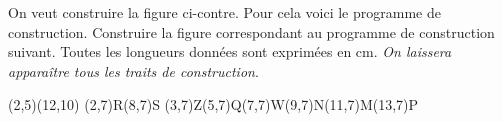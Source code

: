 \vspace*{1cm}\par
\begin{multicols}{2}
On veut construire la figure ci-contre. Pour cela voici le
programme de construction. Construire la figure correspondant au
programme de construction suivant. Toutes les longueurs données
sont exprimées en cm. \textit{On laissera apparaître tous les
traits de construction}.

\columnbreak

\begin{center}
 \pspicture(2,5)(12,10)
    \pstGeonode[PointSymbol=none,PosAngle={180,0}](2,7){R}(8,7){S}
    \pstGeonode[PointName=none,PointSymbol=none](3,7){Z}(5,7){Q}(7,7){W}(9,7){N}(11,7){M}(13,7){P}

      
      
      
      
      
      
      
      
\endpspicture
\end{center}
\end{multicols}

